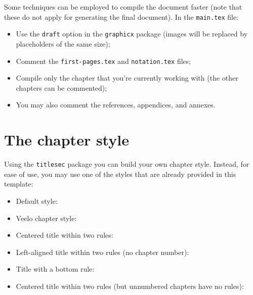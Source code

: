 Some techniques can be employed to compile the document faster (note that these do not apply for generating the final document).
In the \verb+main.tex+ file:

\begin{itemize}
\item Use the \verb+draft+ option in the \verb+graphicx+ package (images will be replaced by placeholders of the same size);
\item Comment the \verb+first-pages.tex+ and \verb+notation.tex+ files;
\item Compile only the chapter that you're currently working with (the other chapters can be commented);
\item You may also comment the references, appendices, and annexes.
\end{itemize}


\section{The chapter style}
\label{c2:s:the-chapter-style}

Using the \verb+titlesec+ package you can build your own chapter style.
Instead, for ease of use, you may use one of the styles that are already provided in this template:

\begin{itemize}

\item
Default style:\\
\verb++

\item
Veelo chapter style:\\
\verb++

\item
Centered title within two rules:\\
\verb++

\item
Left-aligned title within two rules (no chapter number):\\
\verb++

\item
Title with a bottom rule:\\
\verb++

\item
Centered title within two rules (but unnumbered chapters have no rules):\\
\verb++

\end{itemize}

